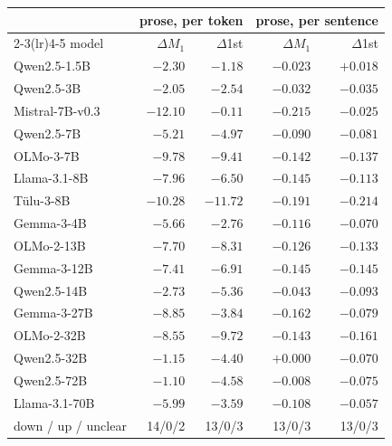 \begin{table}[tb]
\begin{tabular}{lrrrr}
 & \multicolumn{2}{c}{prose, per token} & \multicolumn{2}{c}{prose, per sentence} \\
\cmidrule(lr){2-3}\cmidrule(lr){4-5}
model & $\Delta M_1$ & $\Delta$1st & $\Delta M_1$ & $\Delta$1st \\ \midrule
Qwen2.5-1.5B & $\mathbf{-2.30}$ & $-1.18$ & $-0.023$ & $+0.018$ \\
Qwen2.5-3B & $\mathbf{-2.05}$ & $\mathbf{-2.54}$ & $\mathbf{-0.032}$ & $\mathbf{-0.035}$ \\
Mistral-7B-v0.3 & $\mathbf{-12.10}$ & $-0.11$ & $\mathbf{-0.215}$ & $-0.025$ \\
Qwen2.5-7B & $\mathbf{-5.21}$ & $\mathbf{-4.97}$ & $\mathbf{-0.090}$ & $\mathbf{-0.081}$ \\
OLMo-3-7B & $\mathbf{-9.78}$ & $\mathbf{-9.41}$ & $\mathbf{-0.142}$ & $\mathbf{-0.137}$ \\
Llama-3.1-8B & $\mathbf{-7.96}$ & $\mathbf{-6.50}$ & $\mathbf{-0.145}$ & $\mathbf{-0.113}$ \\
T\"ulu-3-8B & $\mathbf{-10.28}$ & $\mathbf{-11.72}$ & $\mathbf{-0.191}$ & $\mathbf{-0.214}$ \\
Gemma-3-4B & $\mathbf{-5.66}$ & $-2.76$ & $\mathbf{-0.116}$ & $\mathbf{-0.070}$ \\
OLMo-2-13B & $\mathbf{-7.70}$ & $\mathbf{-8.31}$ & $\mathbf{-0.126}$ & $\mathbf{-0.133}$ \\
Gemma-3-12B & $\mathbf{-7.41}$ & $\mathbf{-6.91}$ & $\mathbf{-0.145}$ & $\mathbf{-0.145}$ \\
Qwen2.5-14B & $\mathbf{-2.73}$ & $\mathbf{-5.36}$ & $\mathbf{-0.043}$ & $\mathbf{-0.093}$ \\
Gemma-3-27B & $\mathbf{-8.85}$ & $\mathbf{-3.84}$ & $\mathbf{-0.162}$ & $\mathbf{-0.079}$ \\
OLMo-2-32B & $\mathbf{-8.55}$ & $\mathbf{-9.72}$ & $\mathbf{-0.143}$ & $\mathbf{-0.161}$ \\
Qwen2.5-32B & $-1.15$ & $\mathbf{-4.40}$ & $+0.000$ & $\mathbf{-0.070}$ \\
Qwen2.5-72B & $-1.10$ & $\mathbf{-4.58}$ & $-0.008$ & $\mathbf{-0.075}$ \\
Llama-3.1-70B & $\mathbf{-5.99}$ & $\mathbf{-3.59}$ & $\mathbf{-0.108}$ & $-0.057$ \\
\midrule down / up / unclear & 14/0/2 & 13/0/3 & 13/0/3 & 13/0/3 \\
\bottomrule\end{tabular}
\\[6pt]
\begin{tabular}{lrrrrrrrr}\toprule

\end{tabular}
\end{table}
